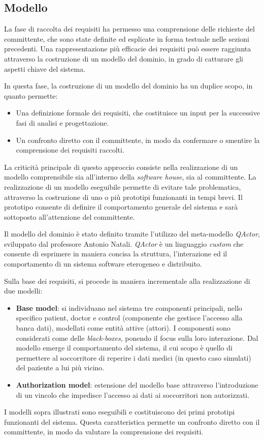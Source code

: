 \documentclass[a4paper,12pt]{report}
\begin{document}
\subsection{Modello}
La fase di raccolta dei requisiti ha permesso una comprensione delle richieste del committente, che sono state definite ed esplicate in forma testuale nelle sezioni precedenti. Una rappresentazione più efficacie dei requisiti può essere raggiunta attraverso la costruzione di un modello del dominio, in grado di catturare gli aspetti chiave del sistema. 

In questa fase, la costruzione di un modello del dominio ha un duplice scopo, in quanto permette:
\begin{itemize}
	\item Una definizione formale dei requisiti, che costituisce un input per la successive fasi di analisi e progettazione.
	\item Un confronto diretto con il committente, in modo da confermare o smentire la comprensione dei requisiti raccolti. 
\end{itemize}

La criticità principale di questo approccio consiste nella realizzazione di un modello comprensibile sia all'interno della \emph{software house}, sia al committente. La realizzazione di un modello eseguibile permette di evitare tale problematica, attraverso la costruzione di uno o più prototipi funzionanti in tempi brevi. Il prototipo consente di definire il comportamento generale del sistema e sarà sottoposto all'attenzione del committente. 

Il modello del dominio è stato definito tramite l'utilizzo del meta-modello \emph{QActor}, sviluppato dal professore Antonio Natali. \emph{QActor} è un linguaggio \emph{custom} che consente di esprimere in maniera concisa la struttura, l'interazione ed il comportamento di un sistema software eterogeneo e distribuito.

Sulla base dei requisiti, si procede in maniera incrementale alla realizzazione di due modelli:
\begin{itemize}
	\item \textbf{Base model}: si individuano nel sistema tre componenti principali, nello specifico patient, doctor e control (componente che gestisce l'accesso alla banca dati), modellati come entità attive (attori). I componenti sono considerati come delle \emph{black-boxes}, ponendo il focus sulla loro interazione. Dal modello emerge il comportamento del sistema, il cui scopo è quello di permettere al soccorritore di reperire i dati medici (in questo caso simulati) del paziente a lui più vicino.
	\item \textbf{Authorization model}: estensione del modello base attraverso l'introduzione di un vincolo che impedisce l'accesso ai dati ai soccorritori non autorizzati.
\end{itemize}
I modelli sopra illustrati sono eseguibili e costituiscono dei primi prototipi funzionanti del sistema. Questa caratteristica permette un confronto diretto con il committente, in modo da valutare la comprensione dei requisiti.
\end{document}

